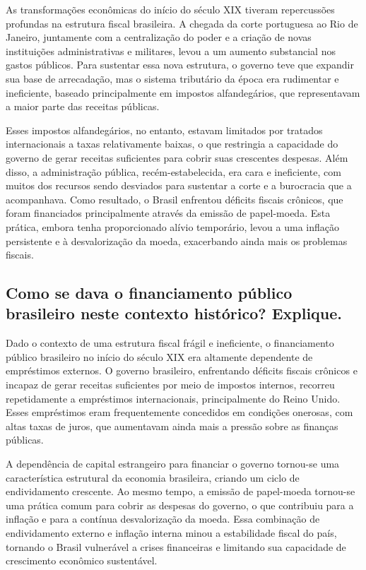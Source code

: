 \documentclass[a4paper,12pt]{article}[abntex2]
\begin{document}
As transformações econômicas do início do século XIX tiveram repercussões profundas na estrutura fiscal brasileira. A chegada da corte portuguesa ao Rio de Janeiro, juntamente com a centralização do poder e a criação de novas instituições administrativas e militares, levou a um aumento substancial nos gastos públicos. Para sustentar essa nova estrutura, o governo teve que expandir sua base de arrecadação, mas o sistema tributário da época era rudimentar e ineficiente, baseado principalmente em impostos alfandegários, que representavam a maior parte das receitas públicas.

Esses impostos alfandegários, no entanto, estavam limitados por tratados internacionais a taxas relativamente baixas, o que restringia a capacidade do governo de gerar receitas suficientes para cobrir suas crescentes despesas. Além disso, a administração pública, recém-estabelecida, era cara e ineficiente, com muitos dos recursos sendo desviados para sustentar a corte e a burocracia que a acompanhava. Como resultado, o Brasil enfrentou déficits fiscais crônicos, que foram financiados principalmente através da emissão de papel-moeda. Esta prática, embora tenha proporcionado alívio temporário, levou a uma inflação persistente e à desvalorização da moeda, exacerbando ainda mais os problemas fiscais.

\subsection{\textbf{Como se dava o financiamento público brasileiro neste contexto histórico? Explique.}}

Dado o contexto de uma estrutura fiscal frágil e ineficiente, o financiamento público brasileiro no início do século XIX era altamente dependente de empréstimos externos. O governo brasileiro, enfrentando déficits fiscais crônicos e incapaz de gerar receitas suficientes por meio de impostos internos, recorreu repetidamente a empréstimos internacionais, principalmente do Reino Unido. Esses empréstimos eram frequentemente concedidos em condições onerosas, com altas taxas de juros, que aumentavam ainda mais a pressão sobre as finanças públicas.

A dependência de capital estrangeiro para financiar o governo tornou-se uma característica estrutural da economia brasileira, criando um ciclo de endividamento crescente. Ao mesmo tempo, a emissão de papel-moeda tornou-se uma prática comum para cobrir as despesas do governo, o que contribuiu para a inflação e para a contínua desvalorização da moeda. Essa combinação de endividamento externo e inflação interna minou a estabilidade fiscal do país, tornando o Brasil vulnerável a crises financeiras e limitando sua capacidade de crescimento econômico sustentável.
\end{document}
